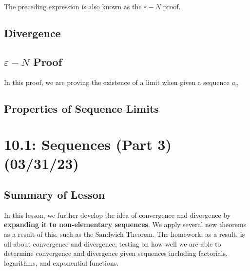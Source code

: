 \documentclass{report}
\newtheorem{definition}{Definition}
\begin{document}
\begin{sloppypar}
\begin{center}
{{      The preceding expression is also known as the $ \varepsilon - N $ proof.
      \[ \]
    }}
\end{center}

\section{Divergence}
\begin{center}
\end{center}

\section{$\varepsilon-N$ Proof}
In this proof, we are proving the existence of a limit
when given a sequence $a_{n}$
\section{Properties of Sequence Limits}

\chapter{10.1: Sequences (Part 3) (03/31/23)}
\section{Summary of Lesson}
In this lesson, we further develop the idea of convergence
and divergence by \textbf{expanding it to non-elementary sequences}. We
apply several new theorems as a result of this, such as the
Sandwich Theorem. The homework, as a result, is all about
convergence and divergence, testing on how well we are
able to determine convergence and divergence given sequences
including factorials, logarithms, and exponential functions.

\end{sloppypar}
\end{document}
